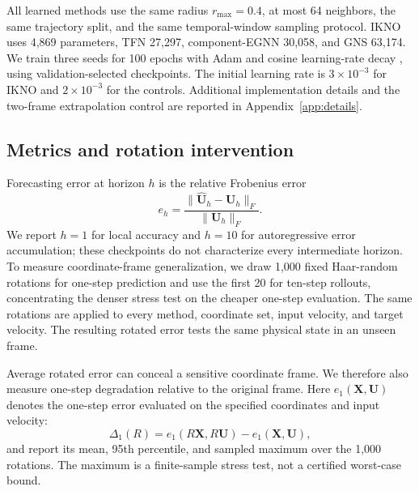 \documentclass[mlmain]{jmlr}
\newcommand{\IKNO}{\textsc{IKNO}}
\begin{document}
All learned methods use the same radius $r_{\max}=0.4$, at most 64 neighbors,
the same trajectory split, and the same temporal-window sampling protocol.
\IKNO{} uses
4,869 parameters, TFN 27,297, component-EGNN 30,058, and GNS 63,174. We train
three seeds for 100 epochs with Adam and cosine learning-rate decay
\citep{kingma2015adam}, using
validation-selected checkpoints. The initial learning rate is
$3\times10^{-3}$ for \IKNO{} and $2\times10^{-3}$ for the controls. Additional
implementation details and the two-frame extrapolation control are reported in
Appendix~\ref{app:details}.

\subsection{Metrics and rotation intervention}

Forecasting error at horizon $h$ is the relative Frobenius error
\begin{equation}
 e_h=\frac{\|\widehat{\boldsymbol{U}}_h-\boldsymbol{U}_h\|_F}
 {\|\boldsymbol{U}_h\|_F}.
 \label{eq:predictionmetric}
\end{equation}
We report $h=1$ for local accuracy and $h=10$ for autoregressive error
accumulation; these checkpoints do not characterize every intermediate
horizon. To measure coordinate-frame generalization, we draw
1,000 fixed Haar-random rotations for one-step prediction and use the first 20
for ten-step rollouts, concentrating the denser stress test on the cheaper
one-step evaluation. The same rotations are applied to every method,
coordinate set, input velocity, and target velocity. The resulting rotated
error tests the same physical state in an unseen frame.

Average rotated error can conceal a sensitive coordinate frame. We therefore
also measure one-step degradation relative to the original frame. Here
$e_1(\boldsymbol X,\boldsymbol U)$ denotes the one-step error evaluated on the
specified coordinates and input velocity:
\begin{equation}
 \Delta_1(R)=e_1(R\boldsymbol{X},R\boldsymbol{U})
             -e_1(\boldsymbol{X},\boldsymbol{U}),
 \label{eq:degradation}
\end{equation}
and report its mean, 95th percentile, and sampled maximum over the 1,000
rotations. The maximum is a finite-sample stress test, not a certified
worst-case bound.
\end{document}
